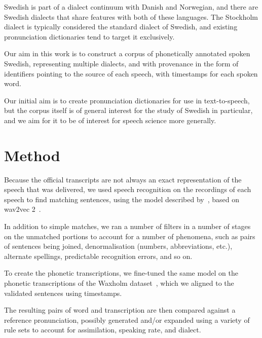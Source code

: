 \documentclass{Interspeech}
\begin{document}
Swedish is part of a dialect continuum with Danish and Norwegian, and there are Swedish dialects that share features with both of these languages. The Stockholm dialect is typically considered the standard dialect of Swedish, and existing pronunciation dictionaries tend to target it exclusively.

Our aim in this work is to construct a corpus of phonetically annotated spoken Swedish, representing multiple dialects, and with provenance in the form of identifiers pointing to the source of each speech, with timestamps for each spoken word.

Our initial aim is to create pronunciation dictionaries for use in text-to-speech, but the corpus itself is of general interest for the study of Swedish in particular, and we aim for it to be of interest for speech science more generally.




\section{Method}

Because the official transcripts are not always an exact representation of the speech that was delivered, we used speech recognition on the recordings of each speech to find matching sentences, using the model described by~\cite{malmstenHearingVoicesNational2022}, based on wav2vec 2~\cite{baevski2020wav2vec2}.

In addition to simple matches, we ran a number of filters in a number of stages on the unmatched portions to account for a number of phenomena, such as pairs of sentences being joined, denormalisation (numbers, abbreviations, etc.), alternate spellings, predictable recognition errors, and so on.

To create the phonetic transcriptions, we fine-tuned the same model on the phonetic transcriptions of the Waxholm dataset~\cite{bertenstamSpokenDialogueData1995}, which we aligned to the validated sentences using timestamps.

The resulting pairs of word and transcription are then compared against a reference pronunciation, possibly generated and/or expanded using a variety of rule sets to account for assimilation, speaking rate, and dialect.
\end{document}
